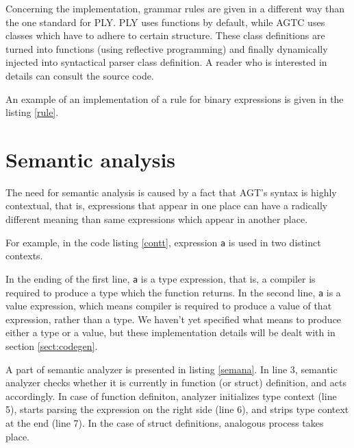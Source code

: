 \documentclass[times, utf8, diplomski]{fer}
\theoremstyle{definition}
\newcommand{\textcode}[3]{
    
}
\begin{document}
\textcode{\resdir/compiler/ast}{ast}{AST resulting from \texttt{let n = in<i32>();}}

Concerning the implementation, grammar rules are given in a different way than the
one standard for PLY. PLY uses functions by default, while AGTC uses
classes which have to adhere to certain structure. These class definitions
are turned into functions (using reflective programming) and finally
dynamically injected into syntactical parser class definition.
A reader who is interested in details can consult the source code.

An example of an implementation of a rule for binary expressions is given in the listing \ref{rule}.
\\

\textcode{\resdir/compiler/rule.py}{rule}{Binary expression rule implementation}

\section{Semantic analysis}

The need for semantic analysis is caused by a fact that AGT's syntax is highly contextual,
that is, expressions that appear in one place can have a radically different meaning
than same expressions which appear in another place.

For example, in the code listing \ref{contt}, expression \texttt{a} is used in two distinct contexts.

\textcode{\resdir/compiler/contextual.agt}{contt}{Contextuality of expression \texttt{a}}

In the ending of the first line, \texttt{a} is a type expression, that is, a
compiler is required to produce a type which the function returns. In the
second line, \texttt{a} is a value expression,
which means compiler is required to produce a value of that expression, rather than a type.
We haven't yet specified what means to produce either a type or a value, but these implementation
details will be dealt with in section \ref{sect:codegen}.

A part of semantic analyzer is presented in listing \ref{semana}.
In line 3, semantic analyzer checks whether it is currently in function (or struct) definition, 
and acts accordingly. In case of function definiton, analyzer initializes type context (line 5),
starts parsing the expression on the right side (line 6), 
and strips type context at the end (line 7).
In the case of struct definitions, analogous process takes place.
\end{document}
